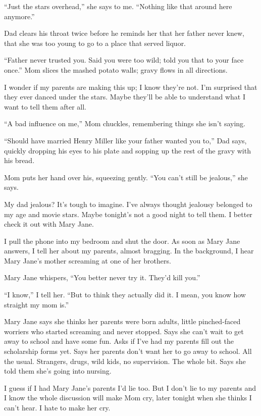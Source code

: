 \documentclass[
]{article}
\begin{document}
``Just the stars overhead,'' she says to me. ``Nothing like that around
here anymore.''

Dad clears his throat twice before he reminds her that her father never
knew, that she was too young to go to a place that served liquor.

``Father never trusted you. Said you were too wild; told you that to
your face once.'' Mom slices the mashed potato walls; gravy flows in all
directions.

I wonder if my parents are making this up; I know they're not. I'm
surprised that they ever danced under the stars. Maybe they'll be able
to understand what I want to tell them after all.

``A bad influence on me,'' Mom chuckles, remembering things she isn't
saying.

``Should have married Henry Miller like your father wanted you to,'' Dad
says, quickly drop­ping his eyes to his plate and sopping up the rest of
the gravy with his bread.

Mom puts her hand over his, squeezing gently. ``You can't still be
jealous,'' she says.

My dad jealous? It's tough to imagine. I've always thought jealousy
belonged to my age and movie stars. Maybe tonight's not a good night to
tell them. I better check it out with Mary Jane.

I pull the phone into my bedroom and shut the door. As soon as Mary Jane
answers, I tell her about my parents, almost bragging. In the
background, I hear Mary Jane's mother screaming at one of her brothers.

Mary Jane whispers, ``You better never try it. They'd kill you.''

``I know,'' I tell her. ``But to think they actually did it. I mean, you
know how straight my mom is.''

Mary Jane says she thinks her parents were born adults, little
pinched-faced worriers who started screaming and never stopped. Says she
can't wait to get away to school and have some fun. Asks if I've had my
parents fill out the scholarship forms yet. Says her parents don't want
her to go away to school. All the usual. Strangers, drugs, wild kids, no
supervision. The whole bit. Says she told them she's going into nursing.

I guess if I had Mary Jane's parents I'd lie too. But I don't lie to my
parents and I know the whole discussion will make Mom cry, later tonight
when she thinks I can't hear. I hate to make her cry.
\end{document}
